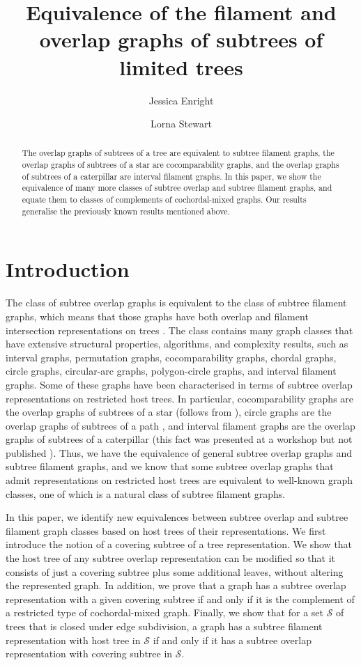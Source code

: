 \documentclass[
final
]{dmtcs-episciences}        \usepackage{graphics, amsthm, amsmath, amssymb, algorithm, algorithmic}
\author{Jessica Enright\affiliationmark{1}
	\and Lorna Stewart\affiliationmark{2}}
\title{Equivalence of the filament and overlap graphs of subtrees of limited trees}
\affiliation{
University of Stirling, Stirling, Scotland, UK\\
	University of Alberta, Edmonton, Alberta, Canada}
\begin{document}

\maketitle

\begin{abstract}
The overlap graphs of subtrees of a tree are equivalent to subtree filament graphs, the overlap graphs of subtrees of a star are cocomparability graphs, and the overlap graphs of subtrees of a caterpillar are interval filament graphs. In this paper, we show the equivalence of many more classes of subtree overlap and subtree filament graphs, and equate them to classes of complements of cochordal-mixed graphs. 
Our results generalise the previously known results mentioned above.
\end{abstract}

\section{Introduction}\label{intro}
The class of subtree overlap graphs is equivalent to the class of subtree filament graphs, which means that those graphs have both overlap and filament intersection representations on trees \cite{Jess}.
The class contains many graph classes that have extensive structural properties, algorithms, and complexity results, such as interval graphs, permutation graphs, cocomparability graphs, chordal graphs, circle graphs, circular-arc graphs, polygon-circle graphs, and interval filament graphs.  
Some of these graphs have been characterised in terms of subtree overlap representations on restricted host trees. In particular, cocomparability graphs are the overlap graphs of subtrees of a star (follows from \cite{GolSch}), circle graphs are the overlap graphs of subtrees of a path \cite{gavril1973}, and interval filament graphs are the overlap graphs of subtrees of a caterpillar (this fact was presented at a workshop but not published \cite{CGO}).
Thus, we have the equivalence of general subtree overlap graphs and subtree filament graphs, and we know that some subtree overlap graphs that admit representations on restricted host trees are equivalent to well-known graph classes, one of which is a natural class of subtree filament graphs.

In this paper, we identify new equivalences between subtree overlap and subtree filament graph classes based on host trees of their representations.
We first introduce the notion of a covering subtree of a tree representation. We show that the host tree of any subtree overlap representation can be modified so that it consists of just a covering subtree plus some additional leaves, without altering the represented graph.
In addition, we prove that a graph has a subtree overlap representation with a given covering subtree if and only if it is the complement of a restricted type of cochordal-mixed graph. 
Finally, we show that for a set $\mathcal{S}$ of trees that is closed under edge subdivision, a graph has a subtree filament representation with host tree in $\mathcal{S}$ if and only if it has a subtree overlap representation with covering subtree in $\mathcal{S}$. 
\end{document}
